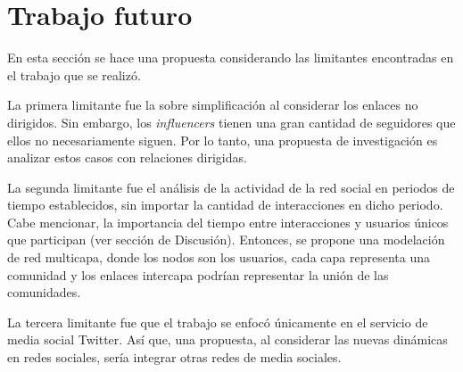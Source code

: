 \documentclass[../main.tex]{subfiles}
\begin{document}

\section*{Trabajo futuro}

En esta sección se hace una propuesta considerando las limitantes encontradas en el trabajo que se realizó. 

La primera limitante fue la sobre simplificación al considerar los enlaces no dirigidos. Sin embargo, los \textit{influencers} tienen una gran cantidad de seguidores que ellos no necesariamente siguen. Por lo tanto, una propuesta de investigación es analizar estos casos con relaciones dirigidas. 



La segunda limitante fue el análisis de la actividad de la red social en periodos de tiempo establecidos, sin importar la cantidad de interacciones en dicho periodo. Cabe mencionar, la importancia del tiempo entre interacciones y usuarios únicos que participan (ver sección de Discusión). Entonces, se propone una modelación de red multicapa, donde los nodos son los usuarios, cada capa representa una comunidad y los enlaces intercapa podrían representar la unión de las comunidades.


La tercera limitante fue que el trabajo se enfocó únicamente en el servicio de media social Twitter. Así que, una propuesta, al considerar las nuevas dinámicas en redes sociales, sería integrar otras redes de media sociales. 

\end{document}
